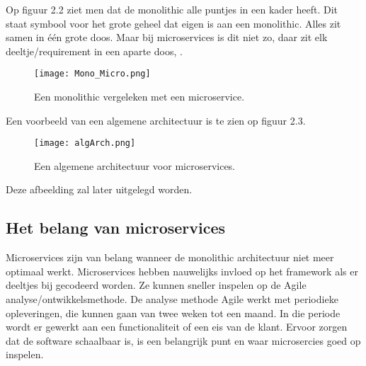  Op figuur 2.2 ziet men dat de monolithic alle puntjes in een kader heeft. Dit staat symbool voor het grote geheel dat eigen is aan een monolithic. Alles zit samen in één grote doos. Maar bij microservices is dit niet zo, daar zit elk deeltje/requirement in een aparte doos, \textcite{Benetis2016a} . 
\begin{figure}[h!]
	\texttt{[image: Mono\_Micro.png]}
	\centering
	\caption{Een monolithic vergeleken met een microservice. \textcite{Benetis2016a}}
\end{figure}


Een voorbeeld van een algemene architectuur is te zien op figuur 2.3.
\begin{figure}[h!]
	\texttt{[image: algArch.png]}
	\centering
	\caption{Een algemene architectuur voor microservices. \textcite{Koukia2018}}
\end{figure}
Deze afbeelding zal later uitgelegd worden.


\subsection{Het belang van microservices}
Microservices zijn van belang wanneer de monolithic architectuur niet meer optimaal werkt. Microservices hebben nauwelijks invloed op het framework als er deeltjes bij gecodeerd worden. Ze kunnen sneller inspelen op de Agile analyse/ontwikkelsmethode. De analyse methode Agile werkt met periodieke opleveringen, die kunnen gaan van twee weken tot een maand. In die periode wordt er gewerkt aan een functionaliteit of een eis van de klant. 
Ervoor zorgen dat de software schaalbaar is, is een belangrijk punt en waar microsercies goed op inspelen.


